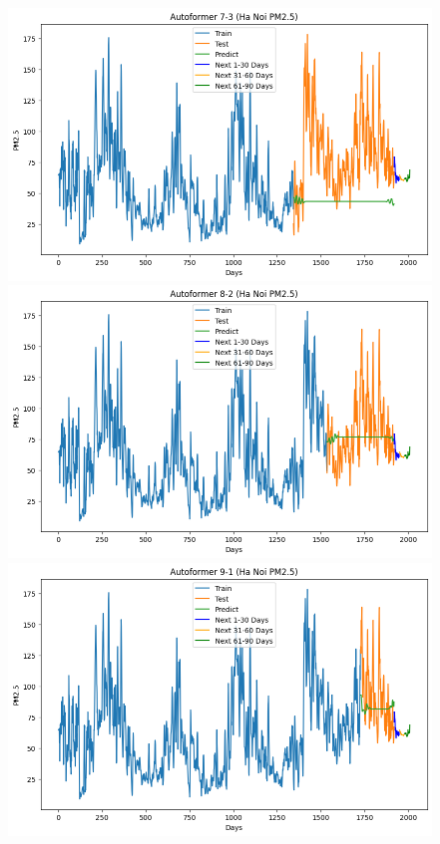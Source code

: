 \begin{figure}[H]
{\begin{adjustbox}{minipage=0.48\textwidth}
\begin{minipage}{0.3\textwidth}
            \end{minipage}\hfill
            \begin{minipage}{0.3\textwidth}
                \centering
                \includegraphics[width=\textwidth]{img/final/Autoformer/90D/Autoformer_7_3_HN.png}\\
                \includegraphics[width=\textwidth]{img/final/Autoformer/90D/Autoformer_8_2_HN.png}\\
                \includegraphics[width=\textwidth]{img/final/Autoformer/90D/Autoformer_9_1_HN.png}

\end{minipage}
\end{adjustbox}}
\end{figure}

